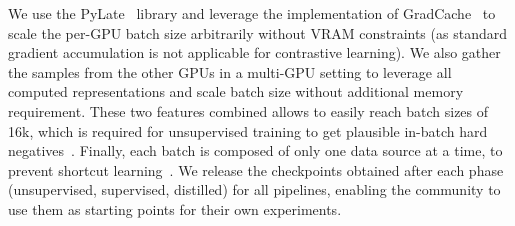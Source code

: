 We use the PyLate~\cite{chaffin2025pylate} library and leverage the implementation of GradCache~\cite{gao2021scaling} to scale the per-GPU batch size arbitrarily without VRAM constraints (as standard gradient accumulation is not applicable for contrastive learning). We also gather the samples from the other GPUs in a multi-GPU setting to leverage all computed representations and scale batch size without additional memory requirement. These two features combined allows to easily reach batch sizes of 16k, which is required for unsupervised training to get plausible in-batch hard negatives~\cite{chen2020simple}. Finally, each batch is composed of only one data source at a time, to prevent shortcut learning~\cite{nussbaum2025nomic}. We release the checkpoints obtained after each phase (unsupervised, supervised, distilled) for all pipelines, enabling the community to use them as starting points for their own experiments.



